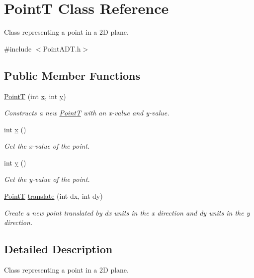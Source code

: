 \hypertarget{class_point_t}{}\section{PointT Class Reference}
\label{class_point_t}


Class representing a point in a 2D plane.  




{\ttfamily \#include $<$Point\+A\+D\+T.\+h$>$}

\subsection*{Public Member Functions}
\begin{DoxyCompactItemize}
\item 
\mbox{\hyperlink{class_point_t_aae04302c9aa775cceafff94d56be4089}{PointT}} (int \mbox{\hyperlink{class_point_t_a6a0f58232f685470f82d3e87c084d690}{x}}, int \mbox{\hyperlink{class_point_t_ae79bfab48ddcec89cd27d22cc465e113}{y}})
\begin{DoxyCompactList}\small\item\em Constructs a new \mbox{\hyperlink{class_point_t}{PointT}} with an x-\/value and y-\/value. \end{DoxyCompactList}\item 
int \mbox{\hyperlink{class_point_t_a6a0f58232f685470f82d3e87c084d690}{x}} ()
\begin{DoxyCompactList}\small\item\em Get the x-\/value of the point. \end{DoxyCompactList}\item 
int \mbox{\hyperlink{class_point_t_ae79bfab48ddcec89cd27d22cc465e113}{y}} ()
\begin{DoxyCompactList}\small\item\em Get the y-\/value of the point. \end{DoxyCompactList}\item 
\mbox{\hyperlink{class_point_t}{PointT}} \mbox{\hyperlink{class_point_t_adf263c54c1e9408c8e473e6f3ebb8834}{translate}} (int dx, int dy)
\begin{DoxyCompactList}\small\item\em Create a new point translated by dx units in the x direction and dy units in the y direction. \end{DoxyCompactList}\end{DoxyCompactItemize}


\subsection{Detailed Description}
Class representing a point in a 2D plane. 

